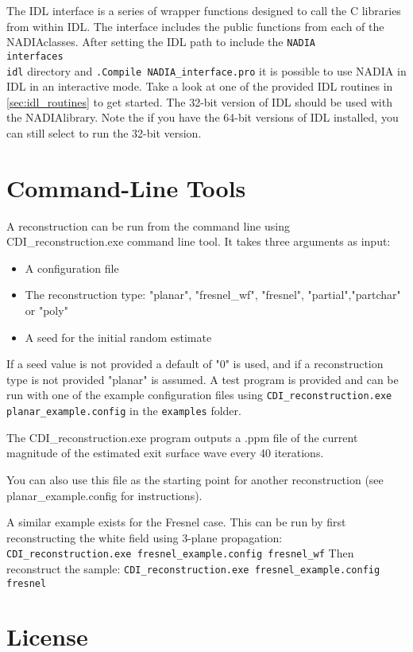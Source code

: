 \documentclass[]{nadia}
\def\name{NADIA}
\begin{document}

The IDL interface is a series of wrapper functions designed to call the C libraries from within IDL. The interface includes the public functions from each of the \name classes. After setting the IDL path to include the {\tt \name\\interfaces\\idl} directory and {\tt .Compile NADIA\_interface.pro} it is possible to use NADIA in IDL in an interactive mode. Take a look at one of the provided IDL routines in \ref{sec:idl_routines} to get started. The 32-bit version of IDL should be used with the \name library. Note the if you have the 64-bit versions of IDL installed, you can still select to run the 32-bit version.


\section{Command-Line Tools}
\label{sec:command_tools}
A reconstruction can be run from the command line using CDI\_reconstruction.exe command line tool. It takes three arguments as input:
\begin{itemize}
\item A configuration file
\item The reconstruction type: "planar", "fresnel\_wf", "fresnel", "partial","partchar" or "poly"
\item A seed for the initial random estimate
\end{itemize}

If a seed value is not provided a default of "0" is used, and if a reconstruction type is not provided "planar" is assumed.
A test program is provided and can be run with one of the example configuration files using {\tt CDI\_reconstruction.exe planar\_example.config} in the {\tt examples} folder.

The CDI\_reconstruction.exe program outputs a .ppm file of the current magnitude of the estimated exit surface wave every 40 iterations. 

You can also use this file as the starting point for another reconstruction (see planar\_example.config for instructions).

A similar example exists for the Fresnel case. This can be run by first reconstructing the white field using 3-plane propagation: 
{\tt CDI\_reconstruction.exe fresnel\_example.config fresnel\_wf}
Then reconstruct the sample: 
{\tt CDI\_reconstruction.exe fresnel\_example.config fresnel}

\section{License}
\end{document}
